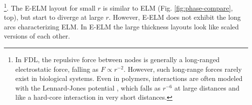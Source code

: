 \documentclass[nofootinbib,preprint,floatfix,endfloats]{revtex4} %
\begin{document}
\footnote{In FDL, the repulsive force between nodes is generally a long-ranged electrostatic force, falling as $F \propto r^{-2}$. 
However, such long-range forces rarely exist in biological systems. Even in polymers, interactions are often modeled with the Lennard-Jones potential \cite{lennard1924determination}, which falls as $r^{-6}$ at large distances and like a hard-core interaction in very short distances.}.
The E-ELM layout for small $r$ is similar to ELM (Fig. \ref{fig:phase-compare}, top), but start to diverge at large $r$. However, E-ELM does not exhibit the long arcs characterizing ELM. In E-ELM the large thickness layouts look like scaled versions of each other. %
%
%
% 
% 
\end{document}
